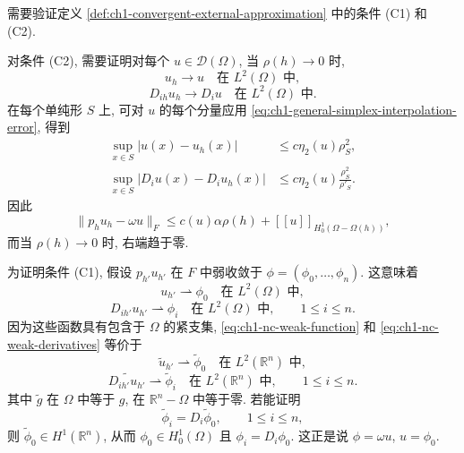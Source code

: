 \begin{Proof}
需要验证定义 \ref{def:ch1-convergent-external-approximation} 中的条件 (C1) 和 (C2).

对条件 (C2), 需要证明对每个 $u\in\mathcal D(\Omega)$, 当 $\rho(h)\to0$ 时,
\begin{equation}
u_h\longrightarrow u
\quad\text{在 }L^2(\Omega)\text{ 中},
\label{eq:ch1-nc-l2-convergence}
\end{equation}
\begin{equation}
D_{ih}u_h\longrightarrow D_iu
\quad\text{在 }L^2(\Omega)\text{ 中}.
\label{eq:ch1-nc-derivative-convergence}
\end{equation}
在每个单纯形 $S$ 上, 可对 $u$ 的每个分量应用 \eqref{eq:ch1-general-simplex-interpolation-error}, 得到
\begin{equation}
\begin{aligned}
\sup_{x\in S}|u(x)-u_h(x)|&\leq c\eta_2(u)\rho_S^2,\\
\sup_{x\in S}|D_iu(x)-D_iu_h(x)|
&\leq c\eta_2(u)\frac{\rho_S^2}{\rho'_S}.
\end{aligned}
\label{eq:ch1-nc-local-interpolation-error}
\end{equation}
因此
\begin{equation}
\|p_hu_h-\omega u\|_F
\leq c(u)\alpha\rho(h)+[[u]]_{H_0^1(\Omega-\Omega(h))},
\label{eq:ch1-nc-global-interpolation-error}
\end{equation}
而当 $\rho(h)\to0$ 时, 右端趋于零.

为证明条件 (C1), 假设 $p_{h'}u_{h'}$ 在 $F$ 中弱收敛于 $\phi=(\phi_0,\ldots,\phi_n)$. 这意味着
\begin{equation}
u_{h'}\rightharpoonup\phi_0
\quad\text{在 }L^2(\Omega)\text{ 中},
\label{eq:ch1-nc-weak-function}
\end{equation}
\begin{equation}
D_{ih'}u_{h'}\rightharpoonup\phi_i
\quad\text{在 }L^2(\Omega)\text{ 中},
\qquad1\leq i\leq n.
\label{eq:ch1-nc-weak-derivatives}
\end{equation}
因为这些函数具有包含于 $\Omega$ 的紧支集, \eqref{eq:ch1-nc-weak-function} 和 \eqref{eq:ch1-nc-weak-derivatives} 等价于
\begin{equation}
\widetilde u_{h'}\rightharpoonup\widetilde\phi_0
\quad\text{在 }L^2(\mathbb R^n)\text{ 中},
\label{eq:ch1-nc-extended-weak-function}
\end{equation}
\begin{equation}
\widetilde{D_{ih'}u_{h'}}\rightharpoonup\widetilde\phi_i
\quad\text{在 }L^2(\mathbb R^n)\text{ 中},
\qquad1\leq i\leq n.
\label{eq:ch1-nc-extended-weak-derivatives}
\end{equation}
其中 $\widetilde g$ 在 $\Omega$ 中等于 $g$, 在 $\mathbb R^n-\Omega$ 中等于零. 若能证明
\begin{equation}
\widetilde\phi_i=D_i\widetilde\phi_0,
\qquad1\leq i\leq n,
\label{eq:ch1-nc-identify-weak-derivative}
\end{equation}
则 $\widetilde\phi_0\in H^1(\mathbb R^n)$, 从而 $\phi_0\in H_0^1(\Omega)$ 且 $\phi_i=D_i\phi_0$. 这正是说 $\phi=\omega u$, $u=\phi_0$.


\end{Proof}
